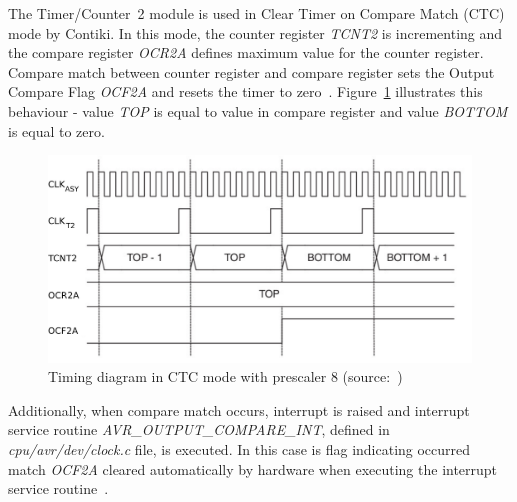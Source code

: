 
The Timer/Counter~2 module is used in Clear Timer on Compare Match (CTC) mode by Contiki.
In this mode, the counter register {\it{TCNT2}} is incrementing
and the compare register {\it{OCR2A}} defines maximum value for the counter register.
Compare match between counter register and compare register
sets the Output Compare Flag {\it{OCF2A}} and resets the timer to zero~\cite{avr-datasheet}.
Figure~\ref{fig:design-timing-diagram} illustrates this behaviour
- value {\it{TOP}} is equal to value in compare register and value {\it{BOTTOM}} is equal to zero.

\begin{figure}
  \centering
  \includegraphics[width=12cm,keepaspectratio]{fig/timing-diagram.pdf}
  \caption{Timing diagram in CTC mode with prescaler 8 (source:~\cite{avr-datasheet})}
  \label{fig:design-timing-diagram}
\end{figure}

Additionally, when compare match occurs,
interrupt is raised and interrupt service routine {\it{AVR\_OUTPUT\_COMPARE\_INT}},
defined in {\it{cpu/avr/dev/clock.c}} file, is executed.
In this case is flag indicating occurred match {\it{OCF2A}}
cleared automatically by hardware when executing
the interrupt service routine~\cite{avr-datasheet}.

